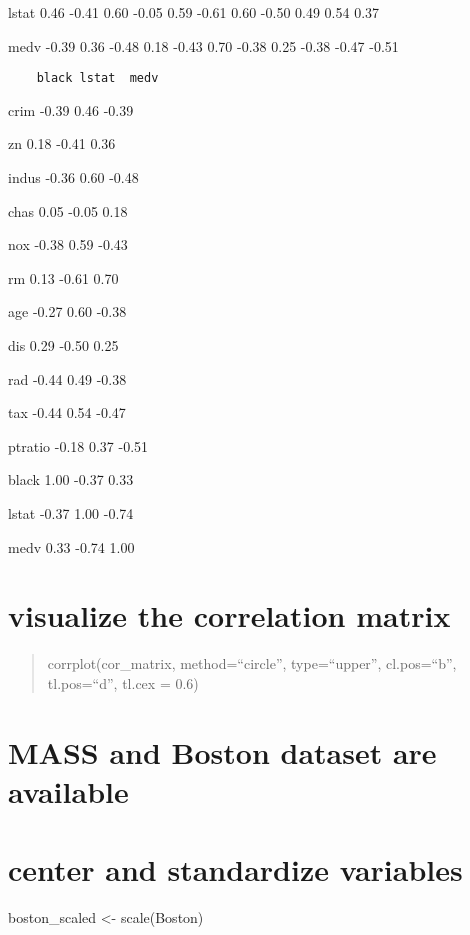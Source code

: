 \documentclass[]{article}
\begin{document}
lstat 0.46 -0.41 0.60 -0.05 0.59 -0.61 0.60 -0.50 0.49 0.54 0.37

medv -0.39 0.36 -0.48 0.18 -0.43 0.70 -0.38 0.25 -0.38 -0.47 -0.51

\begin{verbatim}
    black lstat  medv 
\end{verbatim}

crim -0.39 0.46 -0.39

zn 0.18 -0.41 0.36

indus -0.36 0.60 -0.48

chas 0.05 -0.05 0.18

nox -0.38 0.59 -0.43

rm 0.13 -0.61 0.70

age -0.27 0.60 -0.38

dis 0.29 -0.50 0.25

rad -0.44 0.49 -0.38

tax -0.44 0.54 -0.47

ptratio -0.18 0.37 -0.51

black 1.00 -0.37 0.33

lstat -0.37 1.00 -0.74

medv 0.33 -0.74 1.00

\begin{quote}
\end{quote}

\section{visualize the correlation
matrix}\label{visualize-the-correlation-matrix-1}

\begin{quote}
corrplot(cor\_matrix, method=``circle'', type=``upper'', cl.pos=``b'',
tl.pos=``d'', tl.cex = 0.6)
\end{quote}

\section{MASS and Boston dataset are
available}\label{mass-and-boston-dataset-are-available}

\section{center and standardize
variables}\label{center-and-standardize-variables}

boston\_scaled \textless{}- scale(Boston)
\end{document}
